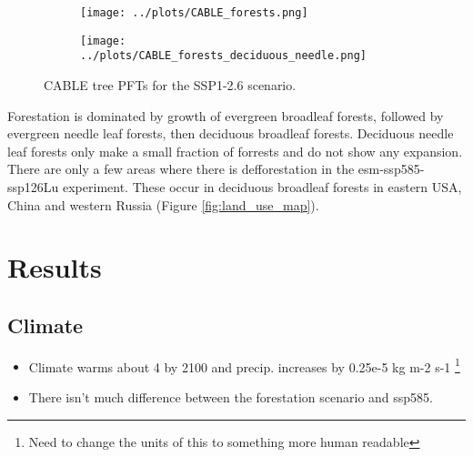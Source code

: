 \documentclass[]{article}
\begin{document}
\begin{figure}[H]
    \centering
    \begin{subfigure}[b]{0.45\linewidth}
        \texttt{[image: ../plots/CABLE\_forests.png]}
    \end{subfigure}
    \begin{subfigure}[b]{0.45\linewidth}
        \texttt{[image: ../plots/CABLE\_forests\_deciduous\_needle.png]}
    \end{subfigure}
    \caption{CABLE tree PFTs for the SSP1-2.6 scenario.}
    \label{fig:CABLE_PFTs}
\end{figure}

Forestation is dominated by growth of evergreen broadleaf forests, followed by evergreen needle leaf forests, then deciduous broadleaf forests.
Deciduous needle leaf forests only make a small fraction of forrests and do not show any expansion.
There are only a few areas where there is defforestation in the esm-ssp585-ssp126Lu experiment.
These occur in deciduous broadleaf forests in eastern USA, China and western Russia (Figure \ref{fig:land_use_map}).

\section{Results}

\subsection{Climate}

\begin{itemize}
    \item Climate warms about 4 \textcelsius{} by 2100 and precip. increases by 0.25e-5 kg m-2 s-1 \footnote{Need to change the units of this to something more human readable}
    \item There isn't much difference between the forestation scenario and ssp585.
\end{itemize}
\end{document}
